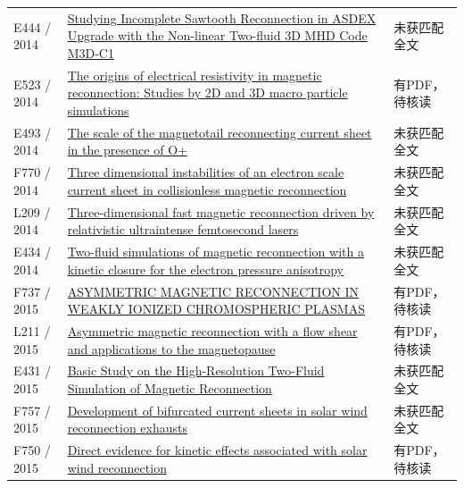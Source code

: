 \begin{longtable}{P{24mm}P{97mm}P{27mm}}
E444 / 2014 & \href{http://citeseerx.ist.psu.edu/viewdoc/summary?doi=10.1.1.717.5563}{Studying Incomplete Sawtooth Reconnection in ASDEX Upgrade with the Non-linear Two-fluid 3D MHD Code M3D-C1} & 未获匹配全文\\

E523 / 2014 & \href{https://doi.org/10.1186/bf03353257}{The origins of electrical resistivity in magnetic reconnection: Studies by 2D and 3D macro particle simulations} & 有PDF，待核读\\

E493 / 2014 & \href{https://doi.org/10.1002/2014gl060440}{The scale of the magnetotail reconnecting current sheet in the presence of O+} & 未获匹配全文\\

F770 / 2014 & \href{https://doi.org/10.1063/1.4885636}{Three dimensional instabilities of an electron scale current sheet in collisionless magnetic reconnection} & 未获匹配全文\\

L209 / 2014 & \href{https://doi.org/10.1103/physreve.89.031101}{Three-dimensional fast magnetic reconnection driven by relativistic ultraintense femtosecond lasers} & 未获匹配全文\\

E434 / 2014 & \href{http://hdl.handle.net/1721.1/95854}{Two-fluid simulations of magnetic reconnection with a kinetic closure for the electron pressure anisotropy} & 未获匹配全文\\

F737 / 2015 & \href{https://doi.org/10.1088/0004-637x/805/2/134}{ASYMMETRIC MAGNETIC RECONNECTION IN WEAKLY IONIZED CHROMOSPHERIC PLASMAS} & 有PDF，待核读\\

L211 / 2015 & \href{https://doi.org/10.1002/2015ja021489}{Asymmetric magnetic reconnection with a flow shear and applications to the magnetopause} & 有PDF，待核读\\

E431 / 2015 & \href{https://nifs-repository.repo.nii.ac.jp/records/7192}{Basic Study on the High-Resolution Two-Fluid Simulation of Magnetic Reconnection} & 未获匹配全文\\

F757 / 2015 & \href{https://doi.org/10.1002/2015gl066820}{Development of bifurcated current sheets in solar wind reconnection exhausts} & 未获匹配全文\\

F750 / 2015 & \href{https://doi.org/10.1038/srep08080}{Direct evidence for kinetic effects associated with solar wind reconnection} & 有PDF，待核读\\


\end{longtable}
